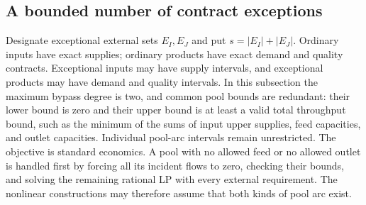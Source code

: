 \subsection{A bounded number of contract exceptions}\label{s5:exceptions}

Designate exceptional external sets $E_I,E_J$ and put
$s=|E_I|+|E_J|$. Ordinary inputs have exact supplies; ordinary products
have exact demand and quality contracts. Exceptional inputs may have
supply intervals, and exceptional products may have demand and quality
intervals. In this subsection the maximum bypass degree is two, and
common pool bounds are redundant: their lower bound is zero and their
upper bound is at least a valid total throughput bound, such as
the minimum of the sums of input upper supplies, feed capacities, and
outlet capacities. Individual pool-arc intervals remain
unrestricted. The objective is standard economics. A pool with no
allowed feed or no allowed outlet is handled first by forcing all its
incident flows to zero, checking their bounds, and
solving the remaining rational LP with every external requirement.
The nonlinear constructions may therefore assume that both kinds of pool arc exist.

